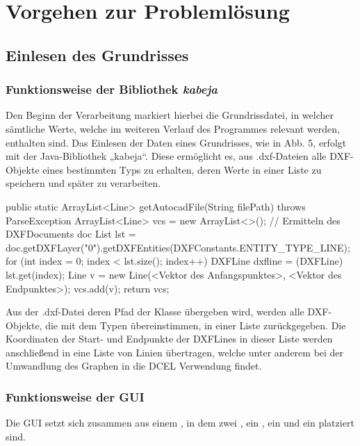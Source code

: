 \chapter{Vorgehen zur Problemlösung}
\section{Einlesen des Grundrisses}

\subsection{Funktionsweise der Bibliothek \textit{kabeja}}
Den Beginn der Verarbeitung markiert hierbei die Grundrissdatei, in welcher sämtliche Werte, welche im weiteren Verlauf des Programmes relevant werden, enthalten sind.
Das Einlesen der Daten eines Grundrisses, wie in Abb. 5, erfolgt mit der Java-Bibliothek „kabeja“. 
Diese ermöglicht es, aus .dxf-Dateien alle DXF-Objekte eines bestimmten Typs zu erhalten, deren Werte in einer Liste zu speichern und später zu verarbeiten. \\

\begin{code}
public static ArrayList<Line> getAutocadFile(String filePath) throws ParseException {
	ArrayList<Line> vcs = new ArrayList<>();
	// Ermitteln des DXFDocuments doc
	List lst = doc.getDXFLayer("0").getDXFEntities(DXFConstants.ENTITY_TYPE_LINE);
	for (int index = 0; index < lst.size(); index++) {
		DXFLine dxfline = (DXFLine) lst.get(index);
		Line v = new Line(<Vektor des Anfangspunktes>, <Vektor des Endpunktes>);
		vcs.add(v);
	}
	return vcs;
}
\end{code}

Aus der .dxf-Datei deren Pfad der Klasse  übergeben wird, werden alle DXF-Objekte, die mit dem Typen  übereinstimmen, in einer Liste zurückgegeben. 
Die Koordinaten der Start- und Endpunkte der DXFLines  in dieser Liste werden anschließend in eine Liste von Linien übertragen, welche unter anderem bei der Umwandlung des Graphen in die DCEL Verwendung findet.

\subsection{Funktionsweise der GUI}
Die GUI setzt sich zusammen aus einem , in dem zwei , ein , ein  und ein  platziert sind.

